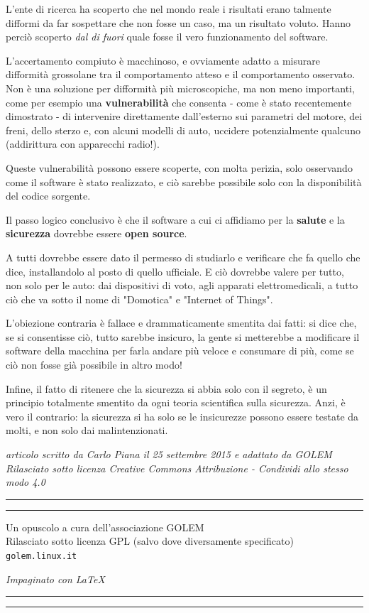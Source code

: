 \documentclass[a4paper, 12pt]{extarticle}
\newcommand*{\footerAT}{\begingroup %

\newlength{\footdrop} %
\footdrop=0.1\textheight %

\rule{\textwidth}{1pt}\par %
\vspace{2pt}\vspace{-\baselineskip} %
\rule{\textwidth}{0.4pt}\par %

\vfill %
\centering{}

Un opuscolo a cura dell'associazione GOLEM\\
Rilasciato sotto licenza GPL (salvo dove diversamente specificato)\\
\texttt{golem.linux.it}

\textit{Impaginato con \LaTeX}
\vspace*{\footdrop} %

\rule{\textwidth}{0.4pt}\par %
\vspace{2pt}\vspace{-\baselineskip} %
\rule{\textwidth}{1pt}\par %

\endgroup}
\begin{document}
L'ente di ricerca ha scoperto che nel mondo reale i risultati erano
talmente difformi da far sospettare che non fosse un caso, ma un
risultato voluto. Hanno perciò scoperto \textit{dal di fuori} quale
fosse il vero funzionamento del software.

L'accertamento compiuto è macchinoso, e ovviamente adatto a misurare
difformità grossolane tra il comportamento atteso e il comportamento
osservato. Non è una soluzione per difformità più microscopiche, ma non
meno importanti, come per esempio una \textbf{vulnerabilità} che
consenta - come è stato recentemente dimostrato - di intervenire
direttamente dall'esterno sui parametri del motore, dei freni, dello
sterzo e, con alcuni modelli di auto, uccidere potenzialmente qualcuno
(addirittura con apparecchi radio!).

Queste vulnerabilità possono essere scoperte, con molta perizia, solo
osservando come il software è stato realizzato, e ciò sarebbe possibile
solo con la disponibilità del codice sorgente.

Il passo logico conclusivo è che il software a cui ci affidiamo per la
\textbf{salute} e la \textbf{sicurezza} dovrebbe essere \textbf{open
source}.

A tutti dovrebbe essere dato il permesso di studiarlo e verificare che
fa quello che dice, installandolo al posto di quello ufficiale. E ciò
dovrebbe valere per tutto, non solo per le auto: dai dispositivi di
voto, agli apparati elettromedicali, a tutto ciò che va sotto il nome
di "Domotica" e "Internet of Things".

L'obiezione contraria è fallace e drammaticamente smentita dai fatti:
si dice che, se si consentisse ciò, tutto sarebbe insicuro, la gente si
metterebbe a modificare il software della macchina per farla andare più
veloce e consumare di più, come se ciò non fosse già possibile in altro
modo!

Infine, il fatto di ritenere che la sicurezza si abbia
solo con il segreto, è un principio totalmente smentito da ogni teoria
scientifica sulla sicurezza. Anzi, è vero il contrario: la sicurezza si
ha solo se le insicurezze possono essere testate da molti, e non solo
dai malintenzionati.

\begin{center}
\textit{articolo scritto da Carlo Piana il 25 settembre 2015 e adattato da GOLEM\\
Rilasciato sotto licenza Creative Commons Attribuzione - Condividi allo stesso modo 4.0}
\end{center}

\clearpage
\thispagestyle{empty}
\mbox{}
\clearpage

\footerAT
\end{document}

